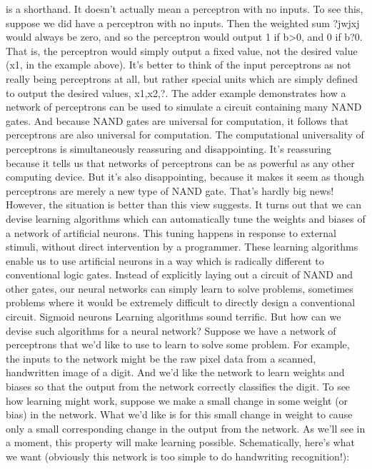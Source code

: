 is a shorthand. It doesn't actually mean a perceptron with no inputs. To see this, suppose we did have a perceptron with no inputs. Then the weighted sum ?jwjxj would always be zero, and so the perceptron would output 1 if b>0, and 0 if b?0. That is, the perceptron would simply output a fixed value, not the desired value (x1, in the example above). It's better to think of the input perceptrons as not really being perceptrons at all, but rather special units which are simply defined to output the desired values, x1,x2,?.
The adder example demonstrates how a network of perceptrons can be used to simulate a circuit containing many NAND gates. And because NAND gates are universal for computation, it follows that perceptrons are also universal for computation.
The computational universality of perceptrons is simultaneously reassuring and disappointing. It's reassuring because it tells us that networks of perceptrons can be as powerful as any other computing device. But it's also disappointing, because it makes it seem as though perceptrons are merely a new type of NAND gate. That's hardly big news!
However, the situation is better than this view suggests. It turns out that we can devise learning algorithms which can automatically tune the weights and biases of a network of artificial neurons. This tuning happens in response to external stimuli, without direct intervention by a programmer. These learning algorithms enable us to use artificial neurons in a way which is radically different to conventional logic gates. Instead of explicitly laying out a circuit of NAND and other gates, our neural networks can simply learn to solve problems, sometimes problems where it would be extremely difficult to directly design a conventional circuit.
Sigmoid neurons
Learning algorithms sound terrific. But how can we devise such algorithms for a neural network? Suppose we have a network of perceptrons that we'd like to use to learn to solve some problem. For example, the inputs to the network might be the raw pixel data from a scanned, handwritten image of a digit. And we'd like the network to learn weights and biases so that the output from the network correctly classifies the digit. To see how learning might work, suppose we make a small change in some weight (or bias) in the network. What we'd like is for this small change in weight to cause only a small corresponding change in the output from the network. As we'll see in a moment, this property will make learning possible. Schematically, here's what we want (obviously this network is too simple to do handwriting recognition!):


